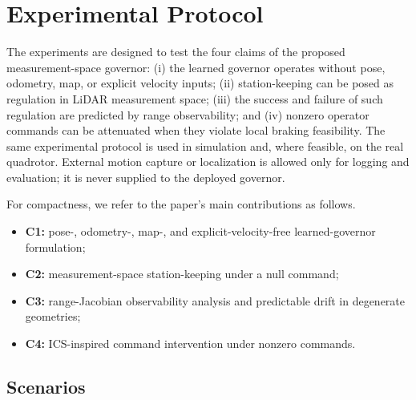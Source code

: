 \documentclass[11pt]{article}
\begin{document}
\clearpage


\section{Experimental Protocol}
\label{sec:experiments}

The experiments are designed to test the four claims of the proposed
measurement-space governor: (i) the learned governor operates without pose,
odometry, map, or explicit velocity inputs; (ii) station-keeping can be posed as
regulation in LiDAR measurement space; (iii) the success and failure of such
regulation are predicted by range observability; and (iv) nonzero operator
commands can be attenuated when they violate local braking feasibility.  The
same experimental protocol is used in simulation and, where feasible, on the
real quadrotor.  External motion capture or localization is allowed only for
logging and evaluation; it is never supplied to the deployed governor.

For compactness, we refer to the paper's main contributions as follows.
\begin{itemize}
    \item \textbf{C1:} pose-, odometry-, map-, and explicit-velocity-free
    learned-governor formulation;
    \item \textbf{C2:} measurement-space station-keeping under a null command;
    \item \textbf{C3:} range-Jacobian observability analysis and predictable
    drift in degenerate geometries;
    \item \textbf{C4:} ICS-inspired command intervention under nonzero
    commands.
\end{itemize}

\subsection{Scenarios}
\label{sec:exp_scenarios}
\end{document}
